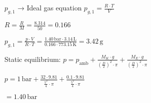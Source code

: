 \( p_{g,1} \) → Ideal gas equation  
\( p_{g,1} = \frac{R \cdot T}{V} \)  

\( R = \frac{R}{M} = \frac{8.314}{50} = 0.166 \)  

\( p_{g,1} = \frac{p \cdot V}{R \cdot T} = \frac{1.40 \, \text{bar} \cdot 3.14 \, \text{L}}{0.166 \cdot 773.15 \, \text{K}} = 3.42 \, \text{g} \)  

Static equilibrium:  
\( p = p_{\text{amb}} + \frac{M_K \cdot g}{\left(\frac{D}{2}\right)^2 \cdot \pi} + \frac{M_E \cdot g}{\left(\frac{D}{2}\right)^2 \cdot \pi} \)  

\( p = 1 \, \text{bar} + \frac{32 \cdot 9.81}{\frac{5^2}{4} \cdot \pi} + \frac{0.1 \cdot 9.81}{\frac{5^2}{4} \cdot \pi} \)  

\( = 1.40 \, \text{bar} \)